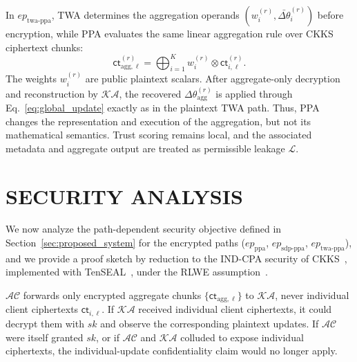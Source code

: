 \documentclass[journal]{IEEEtran}
\begin{document}
In $ep_{\mathrm{twa\text{-}ppa}}$, TWA determines the aggregation operands
$(w_i^{(r)},\bar{\Delta\theta}_i^{(r)})$ before encryption, while PPA evaluates
the same linear aggregation rule over CKKS ciphertext chunks:
\begin{equation}\label{eq:he_agg}
\mathsf{ct}_{\mathrm{agg},\ell}^{(r)}
=
\bigoplus_{i=1}^{K}
w_i^{(r)}\otimes\mathsf{ct}_{i,\ell}^{(r)}.
\end{equation}
The weights $w_i^{(r)}$ are public plaintext scalars. After aggregate-only
decryption and reconstruction by $\mathcal{KA}$, the recovered
$\Delta\theta_{\mathrm{agg}}^{(r)}$ is applied through
Eq.~\eqref{eq:global_update} exactly as in the plaintext TWA path.
Thus, PPA changes the representation and execution of the aggregation, but not
its mathematical semantics. Trust scoring remains local, and the associated
metadata and aggregate output are treated as permissible leakage
$\mathcal{L}$.

\section{SECURITY ANALYSIS}\label{sec:security}

We now analyze the path-dependent security objective defined in
Section~\ref{sec:proposed_system} for the encrypted paths ($ep_{\mathrm{ppa}}$,
$ep_{\mathrm{sdp\text{-}ppa}}$, $ep_{\mathrm{twa\text{-}ppa}}$),
and we provide a proof sketch by reduction to the IND-CPA security of
CKKS~\cite{cheon2017ckks}, implemented with TenSEAL~\cite{benaissa2021tenseal},
under the RLWE assumption~\cite{peikertlattice2014}.

$\mathcal{AC}$ forwards only encrypted aggregate chunks
$\{\mathsf{ct}_{\mathrm{agg},\ell}\}$ to $\mathcal{KA}$, never individual
client ciphertexts $\mathsf{ct}_{i,\ell}$. If $\mathcal{KA}$ received
individual client ciphertexts, it could decrypt them with $sk$ and observe
the corresponding plaintext updates. If $\mathcal{AC}$ were itself
granted $sk$, or if $\mathcal{AC}$ and $\mathcal{KA}$ colluded to expose
individual ciphertexts, the individual-update confidentiality claim would no
longer apply.
\end{document}
